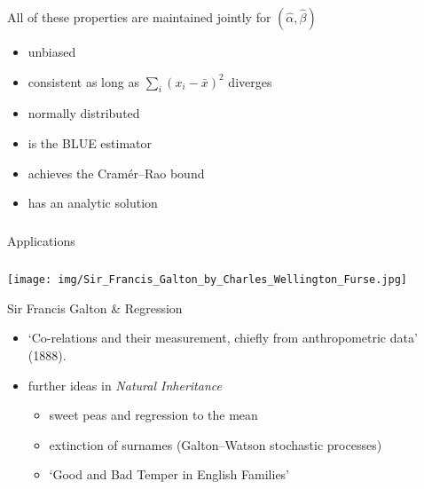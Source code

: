 \begin{frame}[fragile] \frametitle{}

All of these properties are maintained jointly for $(\widehat{\alpha}, \widehat{\beta})$
\begin{itemize}
\item unbiased
\item consistent as long as $\sum_i (x_i-\bar{x})^2$ diverges
\item normally distributed
\item is the BLUE estimator
\item achieves the Cramér–Rao bound
\item has an analytic solution
\end{itemize}

\end{frame}

\begin{frame}[fragile] \frametitle{}

\begin{flushright}
{\color{yaleblue}\sc\fontsize{1cm}{0cm}\selectfont Applications}
\end{flushright}

\end{frame}

\begin{frame}[fragile] \frametitle{}

\noindent
\begin{minipage}{0.35\textwidth}
\texttt{[image: img/Sir\_Francis\_Galton\_by\_Charles\_Wellington\_Furse.jpg]}
\end{minipage}%
\begin{minipage}{0.65\textwidth}
Sir Francis Galton \& Regression \\
\begin{itemize}
\item `Co-relations and their measurement, chiefly from anthropometric data' (1888).
\item further ideas in {\it Natural Inheritance}
\begin{itemize}
\item sweet peas and regression to the mean
\item extinction of surnames (Galton–Watson stochastic processes)
\item `Good and Bad Temper in English Families'
\end{itemize}
\end{itemize}
\end{minipage}

\end{frame}


